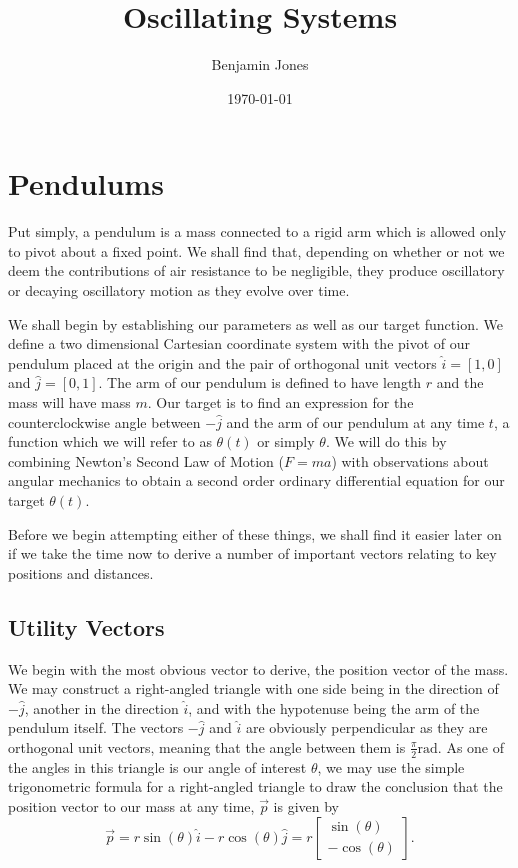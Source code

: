 \documentclass{article}
\title{Oscillating Systems}
\author{Benjamin Jones}
\date{\today}
\begin{document}
\maketitle
\newpage


\section{Pendulums}

Put simply, a pendulum is a mass connected to a rigid arm which is allowed only to pivot about a fixed point. We shall find that, depending on whether or not we deem the contributions of air resistance to be negligible, they produce oscillatory or decaying oscillatory motion as they evolve over time.

We shall begin by establishing our parameters as well as our target function. We define a two dimensional Cartesian coordinate system with the pivot of our pendulum placed at the origin and the pair of orthogonal unit vectors $\hat{i} = [1, 0]$ and $\hat{j} = [0, 1]$. The arm of our pendulum is defined to have length $r$ and the mass will have mass $m$. Our target is to find an expression for the counterclockwise angle between $-\hat{j}$ and the arm of our pendulum at any time $t$, a function which we will refer to as $\theta(t)$ or simply $\theta$. We will do this by combining Newton's Second Law of Motion ($F=ma$) with observations about angular mechanics to obtain a second order ordinary differential equation for our target $\theta(t)$.

Before we begin attempting either of these things, we shall find it easier later on if we take the time now to derive a number of important vectors relating to key positions and distances.

\subsection{Utility Vectors} \label{subsec:utilVectors}

We begin with the most obvious vector to derive, the position vector of the mass. We may construct a right-angled triangle with one side being in the direction of $-\hat{j}$, another in the direction $\hat{i}$, and with the hypotenuse being the arm of the pendulum itself. The vectors $-\hat{j}$ and $\hat{i}$ are obviously perpendicular as they are orthogonal unit vectors, meaning that the angle between them is $\frac{\pi}{2}\text{rad}$. As one of the angles in this triangle is our angle of interest $\theta$, we may use the simple trigonometric formula for a right-angled triangle to draw the conclusion that the position vector to our mass at any time, $\vec{p}$ is given by
\begin{equation} \label{eq:posVector}
	\vec{p} = r\sin(\theta)\hat{i} - r\cos(\theta)\hat{j} = r
	\begin{bmatrix}
		\sin(\theta) \\
		-\cos(\theta)
	\end{bmatrix}
	.
\end{equation}
\end{document}
